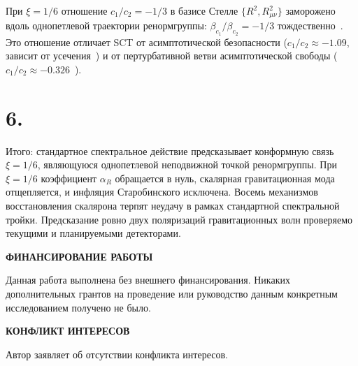 \documentclass[twocolumn,10pt]{article}
\begin{document}
При $\xi = 1/6$ отношение $c_1/c_2 = -1/3$ в базисе Стелле
$\{R^2, R_{\mu\nu}^2\}$ заморожено вдоль однопетлевой траектории
ренормгруппы:
$\beta_{c_1}/\beta_{c_2} = -1/3$
тождественно~\cite{Alfyorov:2026paper1}. Это отношение
отличает SCT от асимптотической безопасности
($c_1/c_2 \approx -1.09$, зависит от
усечения~\cite{BMS:2009}) и от пертурбативной ветви асимптотической
свободы ($c_1/c_2 \approx -0.326$~\cite{Shapiro:2004}).

\section*{6.}
Итого: стандартное спектральное действие предсказывает
конформную связь $\xi = 1/6$, являющуюся однопетлевой
неподвижной точкой ренормгруппы. При $\xi = 1/6$ коэффициент
$\alpha_R$ обращается в нуль, скалярная гравитационная мода
отщепляется, и инфляция Старобинского исключена. Восемь
механизмов восстановления скалярона терпят неудачу в рамках
стандартной спектральной тройки. Предсказание ровно двух
поляризаций гравитационных волн проверяемо текущими и
планируемыми детекторами.

\bigskip

\noindent\textbf{ФИНАНСИРОВАНИЕ РАБОТЫ}

Данная работа выполнена без внешнего финансирования.
Никаких дополнительных грантов на проведение
или руководство данным конкретным исследованием получено не было.

\bigskip

\noindent\textbf{КОНФЛИКТ ИНТЕРЕСОВ}

Автор заявляет об отсутствии конфликта интересов.
\end{document}
